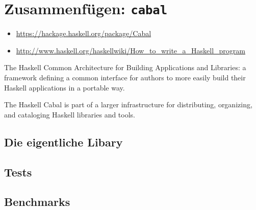 \section{Zusammenfügen: \texttt{cabal}}
\begin{itemize}
  \item \url{https://hackage.haskell.org/package/Cabal}
  \item \url{http://www.haskell.org/haskellwiki/How_to_write_a_Haskell_program}
\end{itemize}
The Haskell Common Architecture for Building Applications and Libraries: a
framework defining a common interface for authors to more easily build their
Haskell applications in a portable way.

The Haskell Cabal is part of a larger infrastructure for distributing,
organizing, and cataloging Haskell libraries and tools.




\subsection{Die eigentliche Libary}


\subsection{Tests}


\subsection{Benchmarks}

